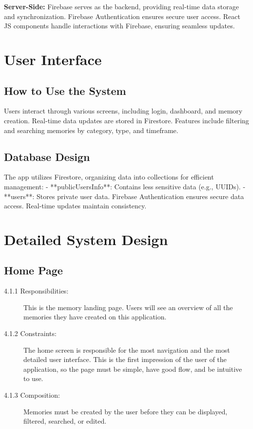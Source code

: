 \documentclass{article}
\begin{document}
\textbf{Server-Side:} 
Firebase serves as the backend, providing real-time data storage and synchronization. Firebase Authentication ensures secure user access. React JS components handle interactions with Firebase, ensuring seamless updates.

\section{User Interface}
\subsection{How to Use the System}
Users interact through various screens, including login, dashboard, and memory creation. Real-time data updates are stored in Firestore. Features include filtering and searching memories by category, type, and timeframe.

\subsection{Database Design}
The app utilizes Firestore, organizing data into collections for efficient management:
- **publicUsersInfo**: Contains less sensitive data (e.g., UUIDs).
- **users**: Stores private user data.
Firebase Authentication ensures secure data access. Real-time updates maintain consistency.

\section{Detailed System Design}
\subsection{Home Page}
\begin{description}
\item[4.1.1 Responsibilities:] This is the memory landing page. Users will see an overview of all the memories they have created
on this application.
\item[4.1.2 Constraints:] The home screen is responsible for the most navigation and the most detailed user
interface. This is the first impression of the user of the application, so the page must be simple, have
good flow, and be intuitive to use.
\item[4.1.3 Composition:] Memories must be created by the user before they can be displayed, filtered, searched, or edited.
\end{description}
\end{document}
